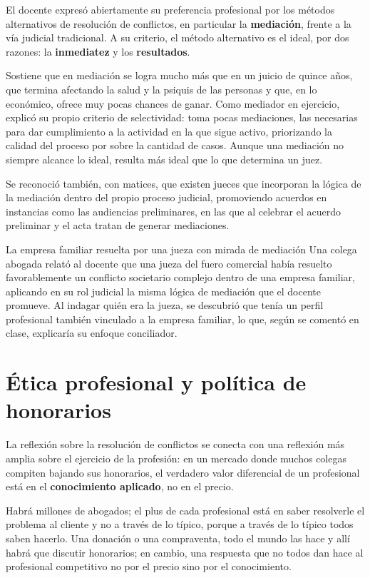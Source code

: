 \documentclass[12pt,oneside]{book}
\begin{document}
El docente expresó abiertamente su preferencia profesional por los métodos alternativos de resolución de conflictos, en particular la \textbf{mediación}, frente a la vía judicial tradicional. A su criterio, el método alternativo es el ideal, por dos razones: la \textbf{inmediatez} y los \textbf{resultados}.

Sostiene que en mediación se logra mucho más que en un juicio de quince años, que termina afectando la salud y la psiquis de las personas y que, en lo económico, ofrece muy pocas chances de ganar. Como mediador en ejercicio, explicó su propio criterio de selectividad: toma pocas mediaciones, las necesarias para dar cumplimiento a la actividad en la que sigue activo, priorizando la calidad del proceso por sobre la cantidad de casos. Aunque una mediación no siempre alcance lo ideal, resulta más ideal que lo que determina un juez.

Se reconoció también, con matices, que existen jueces que incorporan la lógica de la mediación dentro del propio proceso judicial, promoviendo acuerdos en instancias como las audiencias preliminares, en las que al celebrar el acuerdo preliminar y el acta tratan de generar mediaciones.

\begin{example}{La empresa familiar resuelta por una jueza con mirada de mediación}
Una colega abogada relató al docente que una jueza del fuero comercial había resuelto favorablemente un conflicto societario complejo dentro de una empresa familiar, aplicando en su rol judicial la misma lógica de mediación que el docente promueve. Al indagar quién era la jueza, se descubrió que tenía un perfil profesional también vinculado a la empresa familiar, lo que, según se comentó en clase, explicaría su enfoque conciliador.
\end{example}

\section{Ética profesional y política de honorarios}
\label{sec:honorarios}

La reflexión sobre la resolución de conflictos se conecta con una reflexión más amplia sobre el ejercicio de la profesión: en un mercado donde muchos colegas compiten bajando sus honorarios, el verdadero valor diferencial de un profesional está en el \textbf{conocimiento aplicado}, no en el precio.

Habrá millones de abogados; el plus de cada profesional está en saber resolverle el problema al cliente y no a través de lo típico, porque a través de lo típico todos saben hacerlo. Una donación o una compraventa, todo el mundo las hace y allí habrá que discutir honorarios; en cambio, una respuesta que no todos dan hace al profesional competitivo no por el precio sino por el conocimiento.
\end{document}
